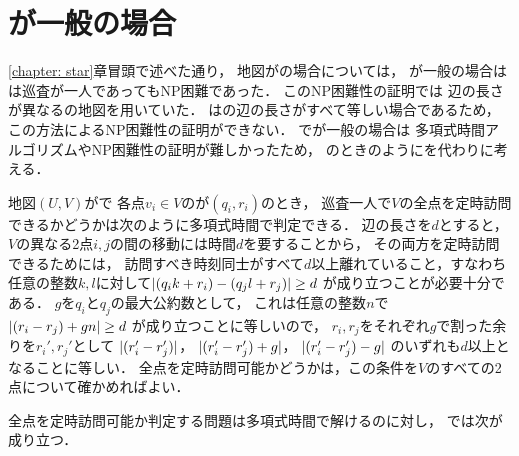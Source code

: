 \section{{\maxIdletime}が一般の場合}
\label{section: UnitArbitraryIdletime}

\ref{chapter: star}章冒頭で述べた通り，
地図が{\graphStar}の場合については，
{\maxIdletime}が一般の場合は
{\patProb}は巡査が一人であってもNP困難であった\cite[Theorem~6]{coene2011charlemagne}．
このNP困難性の証明では
辺の長さが異なる{\graphStar}の地図を用いていた．
{\graphUnit}は{\graphStar}の辺の長さがすべて等しい場合であるため，
この方法によるNP困難性の証明ができない．
{\graphUnit}で{\maxIdletime}が一般の場合は
多項式時間アルゴリズムやNP困難性の証明が難しかったため，
{\graphLine}のときのように{\timeSpecifiedPatProb}を代わりに考える．


地図$(U, V)$が{\graphUnit}で
各点$v_i \in V$の{\exactTime}が$(q_i, r_i)$のとき，
巡査一人で$V$の全点を定時訪問できるかどうかは次のように多項式時間で判定できる．
%
辺の長さを$d$とすると，
$V$の異なる2点$i, j$の間の移動には時間$d$を要することから，
その両方を定時訪問できるためには，
訪問すべき時刻同士がすべて$d$以上離れていること，すなわち
任意の整数$k, l$に対して$\lvert{(q_i k + r_i) - (q_j l + r_j)}\rvert \geq d$%
が成り立つことが必要十分である．
$g$を$q_i$と$q_j$の最大公約数として，
これは任意の整数$n$で
$\lvert{(r_i - r_j) + gn}\rvert \geq d$%
が成り立つことに等しいので，
$r_i, r_j$をそれぞれ$g$で割った余りを$r_i', r_j'$として
$\lvert{(r_i' - r_j')}\rvert$，
$\lvert{(r_i' - r_j') + g}\rvert$，
$\lvert{(r_i' - r_j') - g}\rvert$%
のいずれも$d$以上となることに等しい．
%
全点を定時訪問可能かどうかは，この条件を$V$のすべての2点について確かめればよい．

全点を定時訪問可能か判定する問題は多項式時間で解けるのに対し，
{\timeSpecifiedPatProb}では次が成り立つ．


